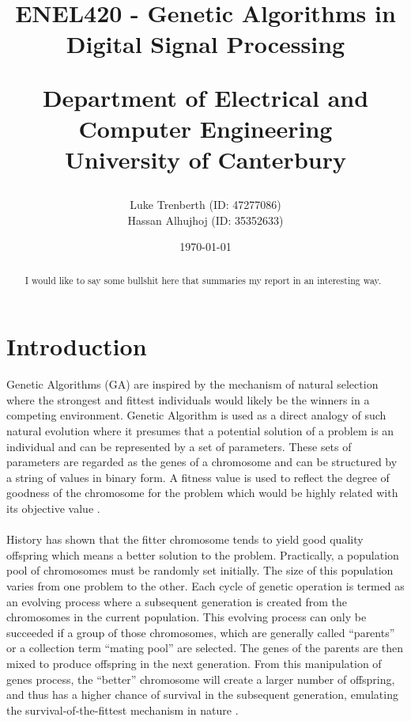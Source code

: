 \documentclass[a4paper, 11pt]{article}
\title{
    ENEL420 - Genetic Algorithms in Digital Signal Processing\\
    \vspace{1cm}
    \begin{large} 
        Department of Electrical and Computer Engineering\\
        University of Canterbury\\
    \end{large}
    \vspace{1cm}
}
\author{
    \small {Luke Trenberth (ID: 47277086)}\\
    \small {Hassan Alhujhoj (ID: 35352633)}\\
    }
\date{\small\today}
\begin{document}
\maketitle

\begin{abstract}
    I would like to say some bullshit here that summaries my report in an interesting way.
\end{abstract}

\pagebreak
{}
\tableofcontents
{}
\pagebreak

\section{Introduction}\label{sec:intro}
    Genetic Algorithms (GA) are inspired by the mechanism of natural selection where the strongest and fittest
    individuals would likely be the winners in a competing environment. Genetic Algorithm is used as a direct 
    analogy of such natural evolution where it presumes that a potential solution of a problem is an individual 
    and can be represented by a set of parameters. These sets of parameters are regarded as the genes of a chromosome 
    and can be structured by a string of values in binary form. A fitness value is used to reflect the degree of 
    goodness of the chromosome for the problem which would be highly related with its objective value \cite{Man1997}.
    \\\\
    History has shown that the fitter chromosome tends to yield good quality offspring which means a
    better solution to the problem. Practically, a population pool of chromosomes must be randomly set initially. 
    The size of this population varies from one problem to the other. Each cycle of genetic operation is termed as 
    an evolving process where a subsequent generation is created from the chromosomes in the current population.  
    This evolving process can only be succeeded if a group of those chromosomes, which are generally called
    “parents” or a collection term “mating pool” are selected. The genes of the parents are then mixed to produce 
    offspring in the next generation. From this manipulation of genes process, the “better” chromosome will create a 
    larger number of offspring, and thus has a higher chance of survival in the subsequent generation, emulating the 
    survival-of-the-fittest mechanism in nature \cite{Man1997}.
    \\\\
\end{document}
